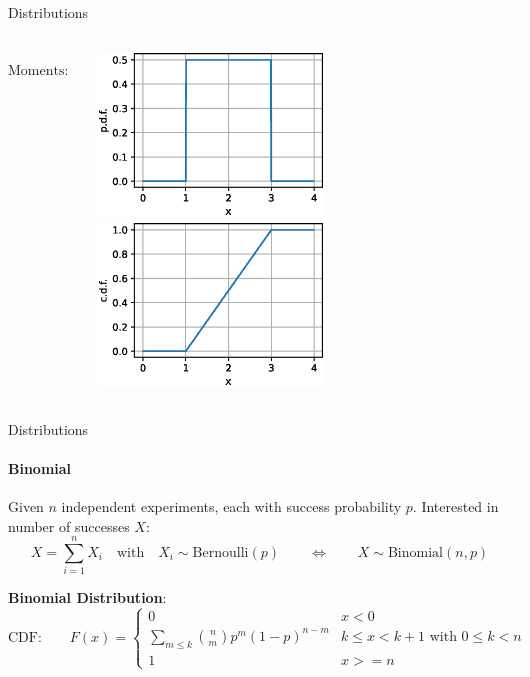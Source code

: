 {\begin{frame}{Distributions}
\begin{columns}[onlytextwidth]
\begin{column}{0.5\textwidth}
\begin{boxed}
                    $$\text{Moments:}\qquad \displaystyle \mu_X = \frac{a+b}{2} \quad \sigma_X^2 = \frac{(b-a)^2}{12}$$
                \end{boxed}
            \end{column}
            \begin{column}{0.5\textwidth}
                \begin{center}
                    \includegraphics[width=0.55\textwidth]{fig/prob_cont_unif_pdf.eps}
                    \includegraphics[width=0.55\textwidth]{fig/prob_cont_unif_cdf.eps}
                \end{center}
            \end{column}
        \end{columns}
    \end{frame}

    \begin{frame}{Distributions}
        \framesubtitle{Binomial}
        Given $n$ independent experiments, each with success probability $p$. Interested in
        number of successes $X$:
        $$X = \sum_{i=1}^n X_i \quad \text{with} \quad X_i \sim \mathrm{Bernoulli}(p)
            \qquad \Longleftrightarrow \qquad X \sim \mathrm{Binomial}(n, p)
        $$

        \vspace*{-2mm}
        \begin{boxed}
            \textbf{Binomial Distribution}:
            $$
                \text{CDF:}\qquad F(x) = \begin{cases}
                    0                                          & x < 0                                   \\
                    \sum_{m \le k} \binom{n}{m} p^m(1-p)^{n-m} & k \le x < k+1 \text{ with } 0 \le k < n \\
                    1                                          & x >= n
                \end{cases}
            $$


\end{boxed}
\end{frame}}
